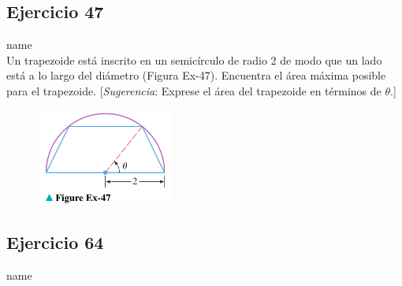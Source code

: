 \documentclass[12pt]{article}
\begin{document}
\subsection{Ejercicio 47} name \\

Un trapezoide está inscrito en un semicírculo de radio 2 de modo que un lado está a lo largo del diámetro (Figura Ex-47). Encuentra el área máxima posible para el trapezoide. [\textit{Sugerencia}: Exprese el área del trapezoide en términos de $\theta$.]
\begin{figure}[H]
\centering
\includegraphics[width=0.4\textwidth]{../img/img_Lista3/3_47.png}
\end{figure}

\subsection{Ejercicio 64} name \\
\end{document}
